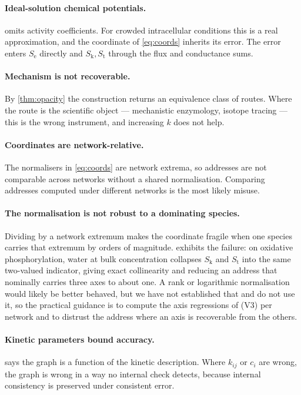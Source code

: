 \documentclass[11pt,twocolumn,a4paper]{article}
\theoremstyle{plain}
\theoremstyle{definition}
\theoremstyle{remark}
\newcommand{\Sk}{S_{\mathrm{k}}}
\newcommand{\St}{S_{\mathrm{t}}}
\newcommand{\Se}{S_{\mathrm{e}}}
\begin{document}
\paragraph{Ideal-solution chemical potentials.}
 omits activity coefficients. For crowded intracellular conditions
this is a real approximation, and the coordinate of \cref{eq:coords} inherits
its error. The error enters $\Se$ directly and $\Sk,\St$ through the flux and
conductance sums.

\paragraph{Mechanism is not recoverable.}
By \cref{thm:opacity} the construction returns an equivalence class of routes.
Where the route is the scientific object --- mechanistic enzymology, isotope
tracing --- this is the wrong instrument, and increasing $k$ does not help.

\paragraph{Coordinates are network-relative.}
The normalisers in \cref{eq:coords} are network extrema, so addresses are not
comparable across networks without a shared normalisation. Comparing addresses
computed under different networks is the most likely misuse.

\paragraph{The normalisation is not robust to a dominating species.}
Dividing by a network extremum makes the coordinate fragile when one species
carries that extremum by orders of magnitude.  exhibits the
failure: on oxidative phosphorylation, water at bulk concentration collapses
$\Sk$ and $\St$ into the same two-valued indicator, giving exact collinearity
and reducing an address that nominally carries three axes to about one. A rank
or logarithmic normalisation would likely be better behaved, but we have not
established that and do not use it, so the practical guidance is to compute the
axis regressions of (V3) per network and to distrust the address where an axis
is recoverable from the others.

\paragraph{Kinetic parameters bound accuracy.}
 says the graph is a function of the kinetic
description. Where $k_{ij}$ or $c_i$ are wrong, the graph is wrong in a way no
internal check detects, because internal consistency is preserved under
consistent error.
\end{document}
